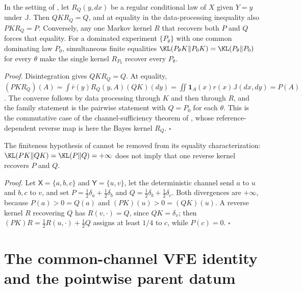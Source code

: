 In the setting of , let $R_Q(y,dx)$ be a regular conditional law of $X$
given $Y=y$ under $\mathbb J$. Then $QKR_Q=Q$, and at equality in the data-processing inequality
also $PKR_Q=P$. Conversely, any one Markov kernel $R$ that recovers both $P$ and $Q$ forces that
equality. For a dominated experiment $\{P_\theta\}$ with one common dominating law $P_0$,
simultaneous finite equalities $\KL(P_\theta K\Vert P_0K)=\KL(P_\theta\Vert P_0)$ for every $\theta$
make the single kernel $R_{P_0}$ recover every $P_\theta$. 

\noindent\emph{Proof.}
Disintegration gives $QKR_Q=Q$. At equality,
$(PKR_Q)(A)=\int\bar r(y)R_Q(y,A)(QK)(dy)=\iint\mathbf 1_A(x)r(x)\mathbb J(dx,dy)=P(A)$. The converse
follows by data processing through $K$ and then through $R$, and the family statement is the pairwise
statement with $Q=P_0$ for each $\theta$. This is the commutative case of the channel-sufficiency
theorem of \citet{Petz1988}, whose reference-dependent reverse map is here the Bayes kernel $R_Q$.
$\square$

The finiteness hypothesis of  cannot be removed from its equality
characterization: $\KL(PK\Vert QK)=\KL(P\Vert Q)=+\infty$ does not imply that one reverse kernel
recovers $P$ and $Q$. 

\noindent\emph{Proof.}
Let $\mathsf X=\{a,b,c\}$ and $\mathsf Y=\{u,v\}$, let the deterministic channel send $a$ to $u$
and $b,c$ to $v$, and set $P=\tfrac12\delta_a+\tfrac12\delta_b$ and
$Q=\tfrac12\delta_b+\tfrac12\delta_c$. Both divergences are $+\infty$, because $P(a)>0=Q(a)$ and
$(PK)(u)>0=(QK)(u)$. A reverse kernel $R$ recovering $Q$ has $R(v,\cdot)=Q$, since $QK=\delta_v$;
then $(PK)R=\tfrac12R(u,\cdot)+\tfrac12Q$ assigns at least $1/4$ to $c$, while $P(c)=0$. $\square$

\section{The common-channel VFE identity and the pointwise parent datum}
\label{sec:cg-elbo}
\label{sec:rg-law-level-vfe}
\label{eq:rg-coarse-channel}

